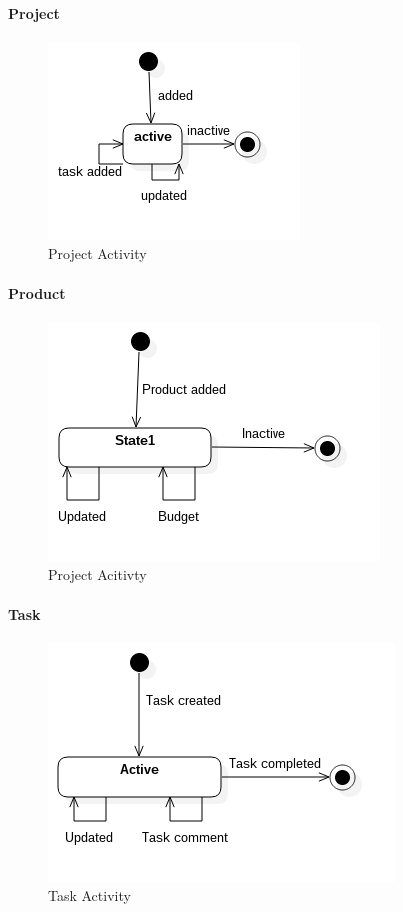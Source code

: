 \paragraph{Project}

\begin{figure}[H]
    \centering
    \includegraphics[scale=0.7]{Images/ProblemDomain/projectActivityDiagram.png}
    \caption{Project Activity}
    \label{fig:projectActivityDiagram}
\end{figure}

\paragraph{Product}

\begin{figure}[H]
    \centering
    \includegraphics[scale=0.7]{Images/ProblemDomain/productActivityDiagram.png}
    \caption{Project Acitivty}
    \label{fig:productAcitvityDiagram}
\end{figure}

\paragraph{Task}

\begin{figure}[H]
    \centering
    \includegraphics[scale=0.7]{Images/ProblemDomain/taskActivityDiagram.png}
    \caption{Task Activity}
    \label{fig:taskActivityDiagram}
\end{figure}

